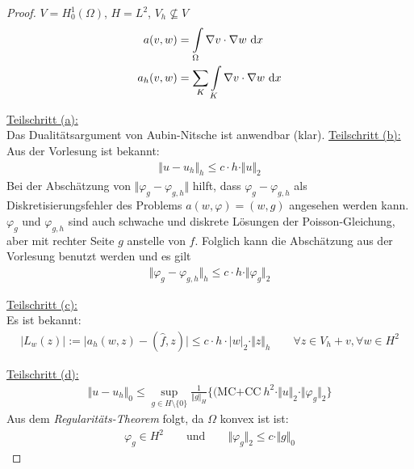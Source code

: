 \documentclass[12pt,a4paper]{article}
\begin{document}
\begin{proof}
$V=H_0^1(\Omega)$, $H=L^2$, $V_h\not\subseteq V$
\begin{align*}
a(v,w)&=\int\limits_\Omega\nabla v\cdot\nabla w\text{ d} x\\
a_h(v,w)&=\sum\limits_K\int\limits_K\nabla v\cdot\nabla w\text{ d} x
\end{align*}

\underline{Teilschritt (a):}\\
Das Dualitätsargument von Aubin-Nitsche ist anwendbar (klar).\nl
\underline{Teilschritt (b):}\\
Aus der Vorlesung ist bekannt:
\begin{align*}
\Vert u-u_h\Vert_h\leq c\cdot h\cdot\Vert u\Vert_2
\end{align*}
Bei der Abschätzung von $\Vert\varphi_g-\varphi_{g,h}\Vert$ hilft, dass $\varphi_g-\varphi_{g,h}$ als Diskretisierungsfehler des Problems $a(w,\varphi)=(w,g)$ angesehen werden kann.\nl
$\varphi_g$ und $\varphi_{g,h}$ sind auch schwache und diskrete Lösungen der Poisson-Gleichung, aber mit rechter Seite $g$ anstelle von $f$. Folglich kann die Abschätzung aus der Vorlesung benutzt werden und es gilt
\begin{align*}
\Vert\varphi_g-\varphi_{g,h}\Vert_h\leq c\cdot h\cdot\Vert\varphi_g\Vert_2
\end{align*}

\underline{Teilschritt (c):}\\
Es ist bekannt:
\begin{align*}
\big|L_w(z)\big|:=\Big|a_h(w,z)-(\hat{f},z)\Big|\leq c\cdot h\cdot|w|_2\cdot\Vert z\Vert_h\qquad\forall z\in V_h+v,\forall w\in H^2
\end{align*}


\underline{Teilschritt (d):}
\begin{align*}
\Vert u-u_h\Vert_0\leq\sup\limits_{g\in H\setminus\lbrace0\rbrace}\frac{1}{\Vert g\Vert_H}\big\lbrace(\text{MC+CC}~h^2\cdot\Vert u\Vert_2\cdot\Vert\varphi_g\Vert_2\big\rbrace
\end{align*}
Aus dem \textit{Regularitäts-Theorem} folgt, da $\Omega$ konvex ist ist:
\begin{align*}
\varphi_g\in H^2\qquad\text{und}\qquad\Vert\varphi_g\Vert_2\leq c\cdot\Vert g\Vert_0
\end{align*}
\end{proof}
\end{document}
